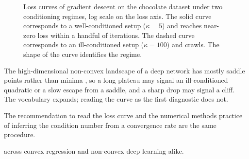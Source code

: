 \begin{figure}[h]
    \centering
    \caption{Loss curves of gradient descent on the chocolate dataset under two conditioning regimes,
    log scale on the loss axis.
    The solid curve corresponds to a well-conditioned setup ($\kappa = 5$) and reaches near-zero loss within a handful of iterations.
    The dashed curve corresponds to an ill-conditioned setup ($\kappa = 100$) and crawls.
    The shape of the curve identifies the regime.}
    \label{fig:loss_curve_shape}
\end{figure}

The high-dimensional non-convex landscape of a deep network has mostly saddle points rather than minima \cite{DeepLearningBookNumericalComputation},
so a long plateau may signal an ill-conditioned quadratic or a slow escape from a saddle, and a sharp drop may signal a cliff.
The vocabulary expands; reading the curve as the first diagnostic does not.

The recommendation to read the loss curve and the numerical methods practice of inferring the condition number from a convergence rate are the same procedure.

\vfill
{} across convex regression and non-convex deep learning alike.

